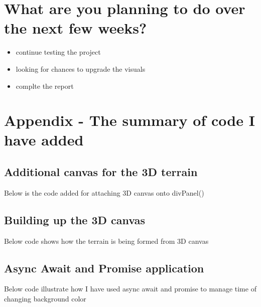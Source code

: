 \section*{What are you planning to do over the next few weeks?}

\begin{itemize}
  \item continue testing the project
  \item looking for chances to upgrade the visuals
  \item complte the report
\end{itemize}

\section*{ Appendix - The summary of code I have added}

\subsection*{Additional canvas for the 3D terrain}

Below is the code added for attaching 3D canvas onto divPanel()



\subsection*{Building up the 3D canvas}

Below code shows how the terrain is being formed from 3D canvas



\subsection*{Async Await and Promise application}

Below code illustrate how I have used async await and promise to manage time of changing background color



